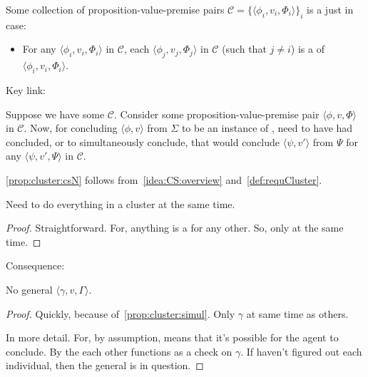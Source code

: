 \begin{note}[\requCluster{3}]
  \begin{definition}[A \requCluster{1}]
    \label{def:requCluster}
    Some collection of proposition-value-premise pairs \(\mathcal{C} = \{\langle \phi_{i}, v_{i}, \Phi_{i} \rangle\}_{i}\) is a \emph{\cluster{}} just in case:
    \begin{itemize}
    \item
      For any \(\langle \phi_{i}, v_{i}, \Phi_{i} \rangle\) in \(\mathcal{C}\), each \(\langle \phi_{j}, v_{j}, \Phi_{j} \rangle\) in \(\mathcal{C}\) (such that \(j \ne i\)) is a \requ{} of \(\langle \phi_{i}, v_{i}, \Phi_{i} \rangle\).
    \end{itemize}
    \vspace{-\baselineskip}
  \end{definition}

  Key link:

  \begin{proposition}
    \label{prop:cluster:csN}
    Suppose we have some  \(\mathcal{C}\).
    Consider some proposition-value-premise pair \(\langle \phi,v,\Phi \rangle\) in \(\mathcal{C}\).
    Now, for concluding \(\langle \phi,v \rangle\) from \(\Sigma\) to be an instance of \csN{}, need to have had concluded, or to simultaneously conclude, that would conclude \(\langle \psi,v' \rangle\) from \(\Psi\) for any \(\langle \psi,v',\Psi \rangle\) in \(\mathcal{C}\).
  \end{proposition}

  \autoref{prop:cluster:csN} follows from~\autoref{idea:CS:overview} and~\autoref{def:requCluster}.

  \begin{proposition}
    \label{prop:cluster:simul}
    Need to do everything in a cluster at the same time.
    \begin{proof}
      Straightforward.
      For, anything is a \requ{} for any other.
      So, only \csV{} at the same time.
    \end{proof}
  \end{proposition}
\end{note}

\begin{note}[No \(\gamma\)]
  Consequence:

  \begin{proposition}
    \label{prop:cluster:no-general}
    No general \(\langle \gamma,v,\Gamma \rangle\).
    \begin{proof}
      Quickly, because of~\ref{prop:cluster:simul}.
      Only \(\gamma\) at same time as others.

      In more detail.
      For, by assumption, \requ{} means that it's possible for the agent to conclude.
      By the each other \requ{} functions as a check on \(\gamma\).
      If haven't figured out each individual, then the general is in question.
    \end{proof}
  \end{proposition}
\end{note}

